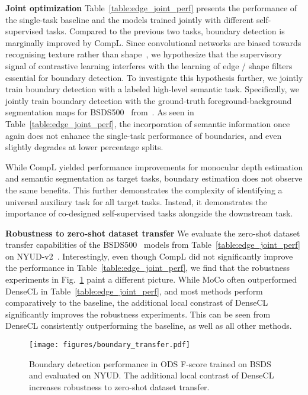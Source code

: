 \documentclass[10pt,twocolumn,letterpaper]{article}
\newcommand{\parsection}[1]{\vspace{1mm}\noindent\textbf{#1 }}
\begin{document}
\parsection{Joint optimization}
Table~\ref{table:edge_joint_perf} presents the performance of the single-task baseline and the models trained jointly with different self-supervised tasks. 
Compared to the previous two tasks, boundary detection is marginally improved by CompL.
Since convolutional networks are biased towards recognising texture rather than shape~\cite{geirhos2018imagenet}, we hypothesize that the supervisory signal of contrastive learning interferes with the learning of edge / shape filters essential for boundary detection. 
To investigate this hypothesis further, we jointly train boundary detection with a labeled high-level semantic task. 
Specifically, we jointly train boundary detection with the ground-truth foreground-background segmentation maps for BSDS500~\cite{arbelaez2010contour} from~\cite{endres2010category}. 
As seen in Table~\ref{table:edge_joint_perf}, the incorporation of semantic information once again does not enhance the single-task performance of boundaries, and even slightly degrades at lower percentage splits. 

While CompL yielded performance improvements for monocular depth estimation and semantic segmentation as target tasks, boundary estimation does not observe the same benefits. 
This further demonstrates the complexity of identifying a universal auxiliary task for all target tasks.
Instead, it demonstrates the importance of co-designed self-supervised tasks alongside the downstream task.

\parsection{Robustness to zero-shot dataset transfer}
We evaluate the zero-shot dataset transfer capabilities of the BSDS500~\cite{arbelaez2010contour} models from Table~\ref{table:edge_joint_perf} on NYUD-v2~\cite{silberman2012indoor}. 
Interestingly, even though CompL did not significantly improve the performance in Table~\ref{table:edge_joint_perf}, we find that the robustness experiments in Fig.~\ref{fig:sup_boundary_zeroshot} paint a different picture.
While MoCo often outperformed DenseCL in Table~\ref{table:edge_joint_perf}, and most methods perform comparatively to the baseline, the additional local constrast of DenseCL significantly improves the robustness experiments. 
This can be seen from DenseCL consistently outperforming the baseline, as well as all other methods.

\begin{figure}[t]
 \centering
  \texttt{[image: figures/boundary\_transfer.pdf]}
\caption{Boundary detection performance in ODS F-score trained on BSDS and evaluated on NYUD. The additional local contrast of DenseCL increases robustness to zero-shot dataset transfer.}
\label{fig:sup_boundary_zeroshot}
\vspace{-0.2in}
\end{figure}
\end{document}
